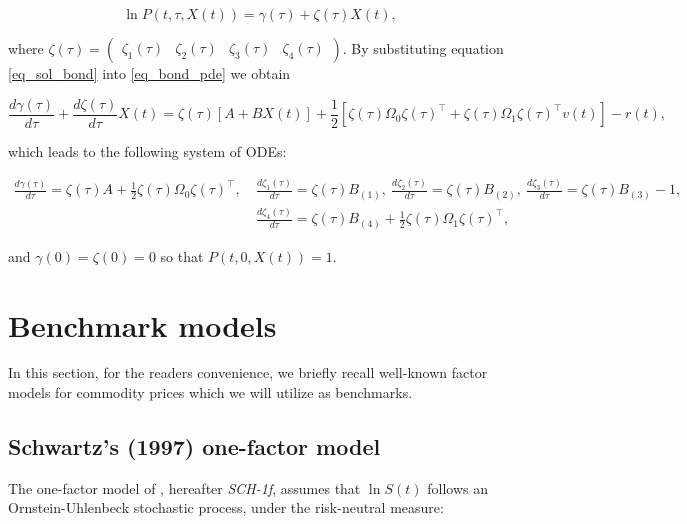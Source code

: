 \documentclass{article}
\begin{document}
\begin{equation} \label{eq_sol_bond}
    \ln P(t, \tau, X(t)) = {\gamma(\tau) + {\zeta}(\tau) {X}(t)},
\end{equation}

\noindent where ${\zeta}(\tau) = \begin{pmatrix}
\zeta_{1}(\tau) & 
\zeta_{2}(\tau) &
\zeta_{3}(\tau) &
\zeta_{4}(\tau)
\end{pmatrix}$. By substituting equation \eqref{eq_sol_bond} into \eqref{eq_bond_pde} we obtain


\begin{equation*}
    \frac{d \gamma(\tau)}{d\tau} +  \frac{d \zeta(\tau)}{d\tau} {X}(t) = \zeta(\tau) [{A} +  {B} {X}(t)] + \frac{1}{2} \left[  \zeta(\tau) \Omega_0 \zeta(\tau)^\top + \zeta(\tau) \Omega_1 \zeta(\tau)^\top v(t) \right] - r(t),
\end{equation*}


\noindent which leads to the following system of ODEs:

\begin{align*}  
\frac{d\gamma(\tau)}{d\tau} = {\zeta(\tau)} A +\frac{1}{2} {\zeta(\tau)\Omega_0\zeta(\tau)^\top}, \
&\frac{d{\zeta_1(\tau)}}{d\tau} = {\zeta(\tau)}{B}_{(1)}, \
\frac{d{\zeta_2(\tau)}}{d\tau} = {\zeta(\tau)}{B}_{(2)}, \
\frac{d{\zeta_3(\tau)}}{d\tau} = {\zeta(\tau)}{B}_{(3)} - 1, \\
&\frac{d{\zeta_4(\tau)}}{d\tau} = {\zeta(\tau)}{B}_{(4)} + \frac{1}{2} {\zeta(\tau)} {\Omega}_1 {\zeta(\tau)}^\top, 
\end{align*}

\noindent and $\gamma(0)= {\zeta}(0) = 0$ so that $P(t,0,X(t)) = 1$.  %



\section{Benchmark models} \label{sec_benchmarks}

In this section, for the readers convenience, we briefly recall well-known factor models for commodity prices which we will utilize as benchmarks.

\subsection{Schwartz's (1997) one-factor model}

The one-factor model of \cite{schwartz97}, hereafter \textit{SCH-1f}, assumes that $\ln S(t)$ follows an Ornstein-Uhlenbeck stochastic process, under the risk-neutral measure:
\end{document}
